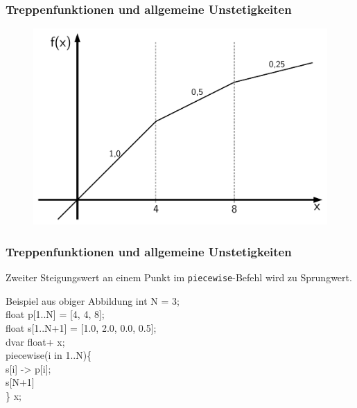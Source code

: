 \begin{frame}
 \frametitle{Treppenfunktionen und allgemeine Unstetigkeiten}
 \begin{figure}
  \centering
  \includegraphics[width=\linewidth,page=3]{Bilder/StueckweiseLineareFunktion3}
 \end{figure}
\end{frame}

\begin{frame}
 \frametitle{Treppenfunktionen und allgemeine Unstetigkeiten}
 Zweiter Steigungswert an einem Punkt im \texttt{piecewise}-Befehl wird zu Sprungwert.
 \begin{block}{Beispiel aus obiger Abbildung}\ttfamily\footnotesize
  int N = 3;\\
  float p[1..N] = [4, \alert{4}, 8];\\
  float s[1..N+1] = [1.0, \alert{2.0}, 0.0, 0.5];\\
  dvar float+ x;\\[2ex]  
  piecewise(i in 1..N)\{\\
    \quad s[i] -> p[i];\\
    \quad s[N+1]\\
  \} x;\\
 \end{block}
\end{frame}
